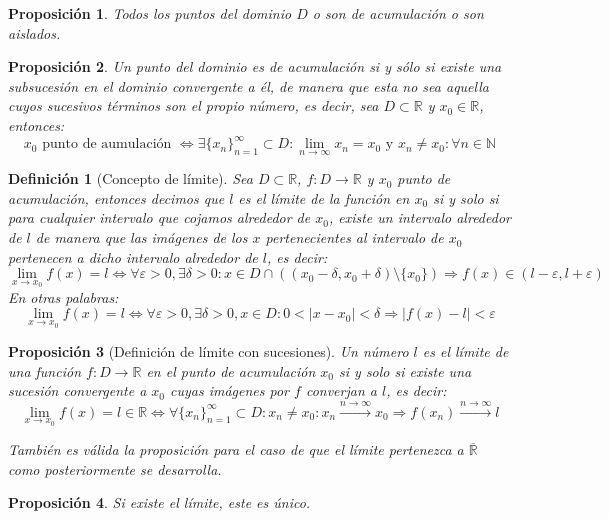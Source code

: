 \documentclass[10pt,a4paper,openright]{book}
\newtheorem{proposicion}{Proposición}[chapter]
\newtheorem{definicion}{Definición}[chapter]
\begin{document}
\begin{proposicion}
Todos los puntos del dominio $D$ o son de acumulación o son aislados.
\end{proposicion}

\begin{proposicion}
Un punto del dominio es de acumulación si y sólo si existe una subsucesión en el dominio convergente a él, de manera que esta no sea aquella cuyos sucesivos términos son el propio número, es decir, sea $D\subset \mathbb R$ y $x_0\in \mathbb R$, entonces:
$$x_0 \mbox{ punto de aumulación }\Leftrightarrow \exists \{x_n\}_{n=1}^\infty \subset D: \lim_{n\rightarrow \infty} x_n=x_0 \mbox{ y }x_n\neq x_0: \forall n\in \mathbb N$$
\end{proposicion}

\begin{definicion}[Concepto de límite]
Sea $D\subset \mathbb R$, $f: D\rightarrow \mathbb R$ y $x_0$ punto de acumulación, entonces decimos que $l$ es el límite de la función en $x_0$ si y solo si para cualquier intervalo que cojamos alrededor de $x_0$, existe un intervalo alrededor de $l$ de manera que las imágenes de los $x$ pertenecientes al intervalo de $x_0$ pertenecen a dicho intervalo alrededor de $l$, es decir:
$$\lim_{x\rightarrow x_0} f(x)=l\Leftrightarrow \forall \varepsilon>0, \exists \delta>0 : x\in D\cap \left((x_0-\delta, x_0+\delta)\mbox{\textbackslash} \{x_0\}\right)\Rightarrow f(x)\in (l-\varepsilon, l+\varepsilon)$$
En otras palabras:
$$\lim_{x\rightarrow x_0} f(x)=l\Leftrightarrow \forall \varepsilon>0, \exists \delta>0, x\in D:0<|x-x_0|<\delta\Rightarrow |f(x)-l|<\varepsilon$$
\end{definicion}

\begin{proposicion}[Definición de límite con sucesiones]
Un número $l$ es el límite de una función $f: D\rightarrow \mathbb R$ en el punto de acumulación $x_0$ si y solo si existe una sucesión convergente a $x_0$ cuyas imágenes por $f$ converjan a $l$, es decir:
$$\lim_{x\rightarrow x_0} f(x)=l\in \mathbb R \Leftrightarrow \forall \{x_n\}_{n=1}^\infty\subset D: x_n\neq x_0: x_n\xrightarrow{n\rightarrow \infty} x_0\Rightarrow 	f(x_n)\xrightarrow{n\rightarrow \infty} l$$

También es válida la proposición para el caso de que el límite pertenezca a $\overline{\mathbb R}$ como posteriormente se desarrolla.
\end{proposicion}

\begin{proposicion}
Si existe el límite, este es único.
\end{proposicion}
\end{document}
